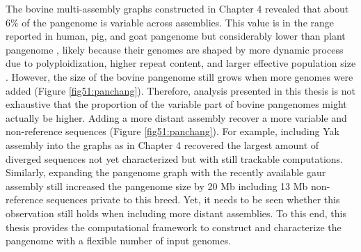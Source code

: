 \documentclass[../main.tex]{subfiles}
\begin{document}
The bovine multi-assembly graphs constructed in Chapter 4 revealed that about 6\% of the pangenome is variable across assemblies. This value is in the range reported in human, pig, and goat \citep{li2017comprehensive,li2019towards,duan2019hupan} pangenome but considerably lower than plant pangenome \citep{golicz2016pangenome,gordon2017extensive,gao2019tomato}, likely because their genomes are shaped by more dynamic process due to polyploidization, higher repeat content, and larger effective population size \citep{lei2021plant}. However, the size of the bovine pangenome still grows when more genomes were added (Figure \ref{fig51:panchang}). Therefore, analysis presented in this thesis is not exhaustive that the proportion of the variable part of bovine pangenomes might actually be higher. Adding a more distant assembly recover a more variable and non-reference sequences (Figure \ref{fig51:panchang}). For example, including Yak assembly into the graphs as in Chapter 4 recovered the largest amount  of diverged sequences not yet characterized but with still trackable computations. Similarly, expanding the pangenome graph with the recently available gaur assembly still increased the pangenome size by 20 Mb including 13 Mb non-reference sequences private to this breed. Yet, it needs to be seen whether this observation still holds when including more distant assemblies. To this end, this thesis provides the computational framework to construct and characterize the pangenome with a flexible number of input genomes. 
\end{document}
